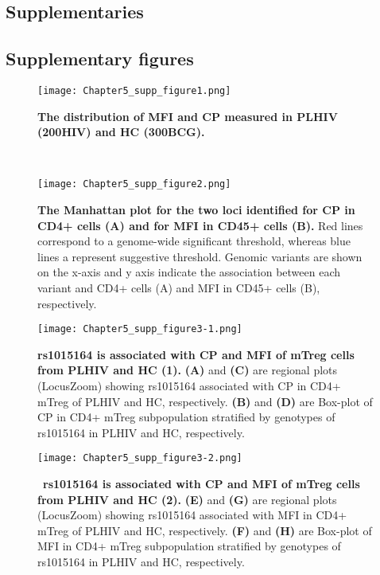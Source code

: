 \documentclass{book}
\begin{document}
\begin{refsection}
\newpage
\section*{Supplementaries}

\subsection*{Supplementary figures}
\renewcommand{\thefigure}{\textbf{Figure S\arabic{chapter}.\arabic{figure}}}
\setcounter{figure}{0}

\begin{figure}[H] %
  \centering
  \texttt{[image: Chapter5\_supp\_figure1.png]}
  \caption{\label{fig:chp5supfig1} \textbf{The distribution of MFI and CP measured in PLHIV (200HIV) and HC (300BCG).}}
\end{figure}
\vfill~


\begin{figure}[H] %
  \centering
  \texttt{[image: Chapter5\_supp\_figure2.png]}
  \caption{\label{fig:chp5supfig2} \textbf{The Manhattan plot for the two loci identified for CP in CD4+ cells (A) and for MFI in CD45+ cells (B).}
    Red lines correspond to a genome-wide significant threshold, whereas blue lines a represent suggestive threshold.
    Genomic variants are shown on the x-axis and y axis indicate the association between each variant and CD4+ cells (A) and MFI in CD45+ cells (B), respectively.
  }
\end{figure}


\begin{figure}[H] %
  \centering
  \texttt{[image: Chapter5\_supp\_figure3-1.png]}
  \caption{\label{fig:chp5supfig3}
     \textbf{rs1015164 is associated with CP and MFI of mTreg cells from PLHIV and HC (1).}
    \textbf{(A)} and \textbf{(C)} are regional plots (LocusZoom) showing rs1015164 associated with CP in CD4+ mTreg of PLHIV and HC, respectively.
    \textbf{(B)} and \textbf{(D)} are Box-plot of CP in CD4+ mTreg subpopulation stratified by genotypes of rs1015164 in PLHIV and HC, respectively.
  }
\end{figure}
\begin{figure}[H] %
  \centering
  \addtocounter{figure}{-1}
  \texttt{[image: Chapter5\_supp\_figure3-2.png]}
  \caption{
    ~\textbf{rs1015164 is associated with CP and MFI of mTreg cells from PLHIV and HC (2).}
    \textbf{(E)} and \textbf{(G)} are regional plots (LocusZoom) showing rs1015164 associated with MFI in CD4+ mTreg of PLHIV and HC, respectively.
    \textbf{(F)} and \textbf{(H)} are Box-plot of MFI in CD4+ mTreg subpopulation stratified by genotypes of rs1015164 in PLHIV and HC, respectively.
  }
\end{figure}


\end{refsection}
\end{document}
